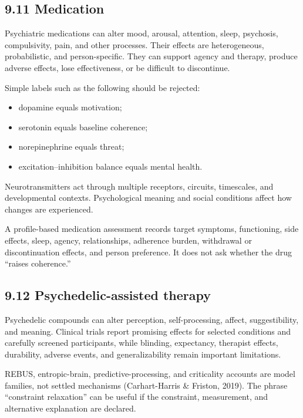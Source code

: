 \documentclass[
  11pt,
]{article}
\providecommand{\tightlist}{%
  \setlength{\itemsep}{0pt}\setlength{\parskip}{0pt}}
\begin{document}
\subsection{9.11 Medication}\label{medication}

Psychiatric medications can alter mood, arousal, attention, sleep,
psychosis, compulsivity, pain, and other processes. Their effects are
heterogeneous, probabilistic, and person-specific. They can support
agency and therapy, produce adverse effects, lose effectiveness, or be
difficult to discontinue.

Simple labels such as the following should be rejected:

\begin{itemize}
\tightlist
\item
  dopamine equals motivation;
\item
  serotonin equals baseline coherence;
\item
  norepinephrine equals threat;
\item
  excitation--inhibition balance equals mental health.
\end{itemize}

Neurotransmitters act through multiple receptors, circuits, timescales,
and developmental contexts. Psychological meaning and social conditions
affect how changes are experienced.

A profile-based medication assessment records target symptoms,
functioning, side effects, sleep, agency, relationships, adherence
burden, withdrawal or discontinuation effects, and person preference. It
does not ask whether the drug ``raises coherence.''

\subsection{9.12 Psychedelic-assisted
therapy}\label{psychedelic-assisted-therapy}

Psychedelic compounds can alter perception, self-processing, affect,
suggestibility, and meaning. Clinical trials report promising effects
for selected conditions and carefully screened participants, while
blinding, expectancy, therapist effects, durability, adverse events, and
generalizability remain important limitations.

REBUS, entropic-brain, predictive-processing, and criticality accounts
are model families, not settled mechanisms (Carhart-Harris \& Friston,
2019). The phrase ``constraint relaxation'' can be useful if the
constraint, measurement, and alternative explanation are declared.
\end{document}

